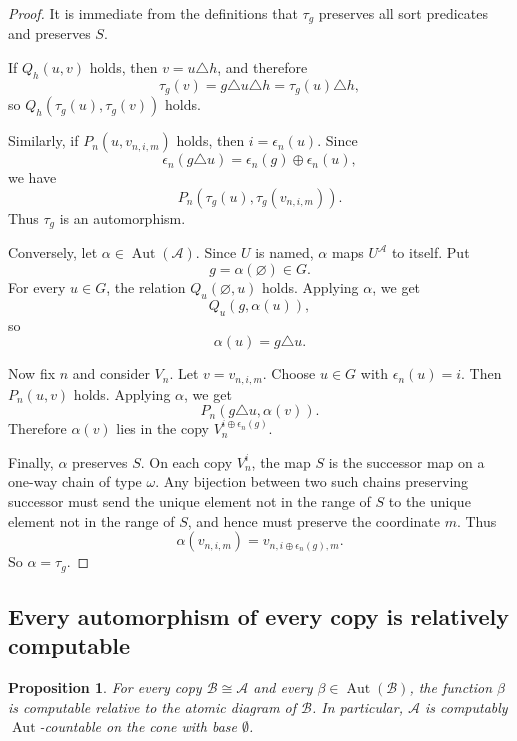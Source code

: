 \documentclass[12pt]{article}
\newtheorem{proposition}{Proposition}
\newcommand{\Aut}{\operatorname{Aut}}
\begin{document}
\begin{proof}
It is immediate from the definitions that $\tau_g$ preserves all sort predicates and preserves $S$.

If $Q_h(u,v)$ holds, then $v=u\triangle h$, and therefore
\[
\tau_g(v)=g\triangle u\triangle h=\tau_g(u)\triangle h,
\]
so $Q_h(\tau_g(u),\tau_g(v))$ holds.

Similarly, if $P_n(u,v_{n,i,m})$ holds, then $i=\epsilon_n(u)$.  Since
\[
\epsilon_n(g\triangle u)=\epsilon_n(g)\oplus\epsilon_n(u),
\]
we have
\[
P_n(\tau_g(u),\tau_g(v_{n,i,m})).
\]
Thus $\tau_g$ is an automorphism.

Conversely, let $\alpha\in\Aut(\mathcal A)$.  Since $U$ is named, $\alpha$ maps $U^{\mathcal A}$ to itself.  Put
\[
g=\alpha(\varnothing)\in G.
\]
For every $u\in G$, the relation $Q_u(\varnothing,u)$ holds.  Applying $\alpha$, we get
\[
Q_u(g,\alpha(u)),
\]
so
\[
\alpha(u)=g\triangle u.
\]

Now fix $n$ and consider $V_n$.  Let $v=v_{n,i,m}$.  Choose $u\in G$ with
$\epsilon_n(u)=i$.  Then $P_n(u,v)$ holds.  Applying $\alpha$, we get
\[
P_n(g\triangle u,\alpha(v)).
\]
Therefore $\alpha(v)$ lies in the copy $V_n^{i\oplus\epsilon_n(g)}$.

Finally, $\alpha$ preserves $S$.  On each copy $V_n^i$, the map $S$ is the successor map on a one-way chain of type $\omega$.  Any bijection between two such chains preserving successor must send the unique element not in the range of $S$ to the unique element not in the range of $S$, and hence must preserve the coordinate $m$.  Thus
\[
\alpha(v_{n,i,m})=v_{n,i\oplus\epsilon_n(g),m}.
\]
So $\alpha=\tau_g$.
\end{proof}

\subsection*{Every automorphism of every copy is relatively computable}

\begin{proposition}
For every copy $\mathcal B\cong\mathcal A$ and every
$\beta\in\Aut(\mathcal B)$, the function $\beta$ is computable relative to
the atomic diagram of $\mathcal B$.  In particular, $\mathcal A$ is
computably $\Aut$-countable on the cone with base $\emptyset$.
\end{proposition}
\end{document}
